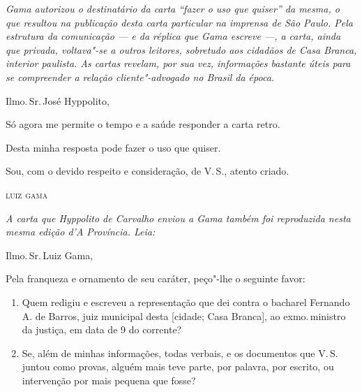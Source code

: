 \begin{flushleft}
{\footnotesize\itshape
Gama autorizou o destinatário da carta ``fazer o uso que quiser'' da
mesma, o que resultou na publicação desta carta particular na imprensa
de São Paulo. Pela estrutura da comunicação --- e da réplica que Gama
escreve ---, a carta, ainda que privada, voltava"-se a outros leitores,
sobretudo aos cidadãos de Casa Branca, interior paulista. As cartas
revelam, por sua vez, informações bastante úteis para se compreender a
relação cliente"-advogado no Brasil da época.}
\end{flushleft}

\noindent{}Ilmo.\,Sr.\,José Hyppolito,\smallskip

Só agora me permite o tempo e a saúde responder a carta retro.


Desta minha resposta pode fazer o uso que quiser.

Sou, com o devido respeito e consideração, de V.\,S., atento criado.\bigskip

\hfill\textsc{luiz gama}

\noindent\dotfill\pagebreak

\begin{flushleft}
{\footnotesize\itshape
A carta que Hyppolito de Carvalho enviou a Gama também foi reproduzida
  nesta mesma edição d'\emph{A Província}. Leia:}
\end{flushleft}

\noindent{}Ilmo.\,Sr.\,Luiz Gama,\smallskip

Pela franqueza e ornamento de seu caráter, peço"-lhe o seguinte favor:

\begin{enumerate}[label=\arabic*º:]
\item Quem redigiu e escreveu a representação que dei contra o bacharel
Fernando A. de Barros, juiz municipal desta {[}cidade; Casa Branca{]},
ao exmo.\,ministro da justiça, em data de 9 do corrente?

\item Se, além de minhas informações, todas verbais, e os documentos que
V.\,S. juntou como provas, alguém mais teve parte, por palavra, por
escrito, ou intervenção por mais pequena que fosse?
\end{enumerate}

